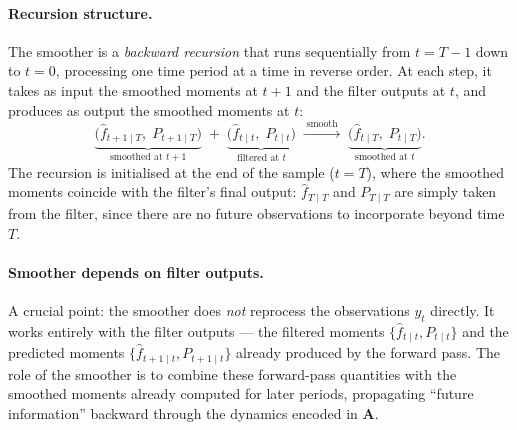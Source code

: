 \documentclass[11pt, a4paper, oneside]{article}
\newcommand{\mA}{\mathbf{A}}
\begin{document}
\paragraph{Recursion structure.}
The smoother is a \emph{backward recursion} that runs sequentially
from $t = T-1$ down to $t = 0$, processing one time period at a time
in reverse order. At each step, it takes as input the smoothed
moments at $t+1$ and the filter outputs at $t$, and produces as
output the smoothed moments at $t$:
\[
\underbrace{\big(\hat{f}_{t+1 \mid T},\; P_{t+1 \mid T}\big)}_{\text{smoothed at } t+1}
\;+\;
\underbrace{\big(\hat{f}_{t \mid t},\; P_{t \mid t}\big)}_{\text{filtered at } t}
\;\xrightarrow{\;\text{smooth}\;}\;
\underbrace{\big(\hat{f}_{t \mid T},\; P_{t \mid T}\big)}_{\text{smoothed at } t}.
\]
The recursion is initialised at the end of the sample ($t = T$),
where the smoothed moments coincide with the filter's final output:
$\hat{f}_{T \mid T}$ and $P_{T \mid T}$ are simply taken from the
filter, since there are no future observations to incorporate beyond
time $T$.

\paragraph{Smoother depends on filter outputs.}
A crucial point: the smoother does \emph{not} reprocess the
observations $y_t$ directly. It works entirely with the filter
outputs — the filtered moments $\{\hat{f}_{t \mid t}, P_{t \mid t}\}$
and the predicted moments $\{\hat{f}_{t+1 \mid t}, P_{t+1 \mid t}\}$
already produced by the forward pass. The role of the smoother is
to combine these forward-pass quantities with the smoothed moments
already computed for later periods, propagating ``future
information'' backward through the dynamics encoded in $\mA$.
\end{document}
